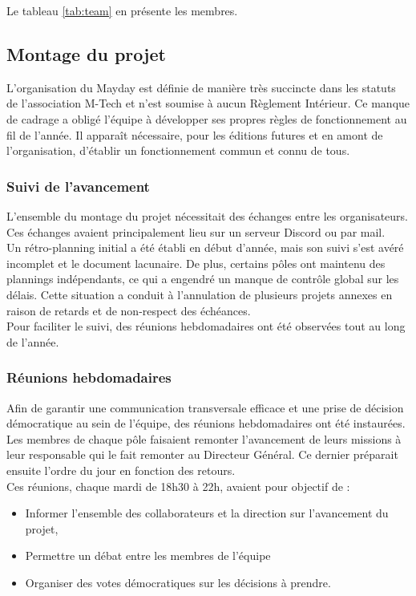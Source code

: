 \documentclass[12pt,a4paper]{report}
\begin{document}
Le tableau \ref{tab:team} en présente les membres.

\subsection{Montage du projet}

L’organisation du Mayday est définie de manière très succincte dans les statuts de l’association M-Tech et n’est soumise à aucun Règlement Intérieur. Ce manque de cadrage a obligé l’équipe à développer ses propres règles de fonctionnement au fil de l’année. Il apparaît nécessaire, pour les éditions futures et en amont de l’organisation, d’établir un fonctionnement commun et connu de tous.

\subsubsection{Suivi de l'avancement}
L'ensemble du montage du projet nécessitait des échanges entre les organisateurs. Ces échanges avaient principalement lieu sur un serveur Discord ou par mail.\\

Un rétro-planning initial a été établi en début d'année, mais son suivi s'est avéré incomplet et le document lacunaire. De plus, certains pôles ont maintenu des plannings indépendants, ce qui a engendré un manque de contrôle global sur les délais. Cette situation a conduit à l'annulation de plusieurs projets annexes en raison de retards et de non-respect des échéances.\\

Pour faciliter le suivi, des réunions hebdomadaires ont été observées tout au long de l’année.

\subsubsection{Réunions hebdomadaires}
Afin de garantir une communication transversale efficace et une prise de décision démocratique au sein de l'équipe, des réunions hebdomadaires ont été instaurées. Les membres de chaque pôle faisaient remonter l’avancement de leurs missions à leur responsable qui le fait remonter au Directeur Général. Ce dernier préparait ensuite l’ordre du jour en fonction des retours.\\

Ces réunions, chaque mardi de 18h30 à 22h, avaient pour objectif de :
\begin{itemize}
\item Informer l'ensemble des collaborateurs et la direction sur l'avancement du projet,
\item Permettre un débat entre les membres de l’équipe
\item Organiser des votes démocratiques sur les décisions à prendre.\\
\end{itemize}
\end{document}
